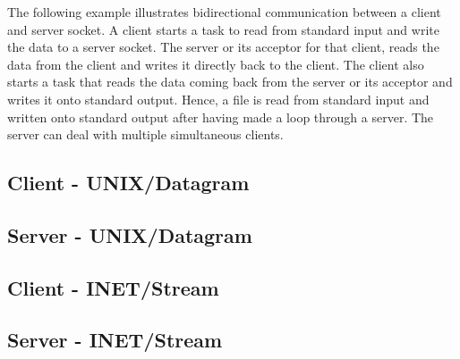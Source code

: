 \documentclass[openright,twoside]{report}
\begin{document}
The following example illustrates bidirectional communication between a client and server socket.
A client starts a task to read from standard input and write the data to a server socket.
The server or its acceptor for that client, reads the data from the client and writes it directly back to the client.
The client also starts a task that reads the data coming back from the server or its acceptor and writes it onto standard output.
Hence, a file is read from standard input and written onto standard output after having made a loop through a server.
The server can deal with multiple simultaneous clients.


\subsection{Client - UNIX/Datagram}
\label{s:ClientUNIXDatagram}



\subsection{Server - UNIX/Datagram}
\label{s:ServerUNIXDatagram}



\subsection{Client - INET/Stream}
\label{s:ClientINETStream}



\subsection{Server - INET/Stream}
\label{s:ServerINETStream}







\end{document}
